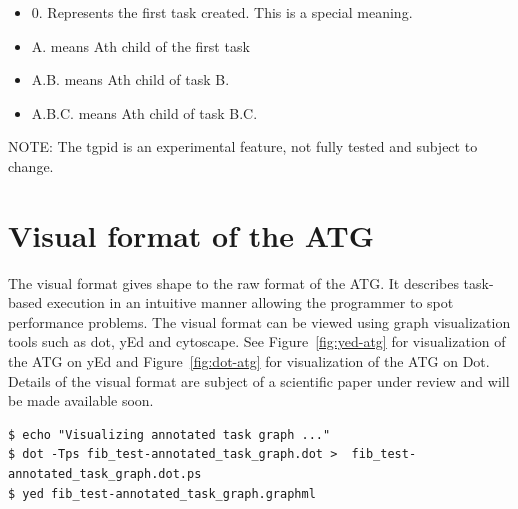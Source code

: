 \documentclass[11pt,a4paper,notitlepage]{article}
\begin{document}
\begin{itemize}
\item 0. Represents the first task created. This is a special meaning.
\item A. means Ath child of the first task
\item A.B. means Ath child of task B.
\item A.B.C. means Ath child of task B.C.
\end{itemize}

NOTE: The tgpid is an experimental feature, not fully tested and subject to change.

\section{Visual format of the ATG}
The visual format gives shape to the raw format of the ATG.
It describes task-based execution in an intuitive manner allowing the programmer to spot performance problems.
The visual format can be viewed using graph visualization tools such as dot, yEd and cytoscape.
See Figure~\ref{fig:yed-atg} for visualization of the ATG on yEd and Figure~\ref{fig:dot-atg} for visualization of the ATG on Dot.
Details of the visual format are subject of a scientific paper under review and will be made available soon.

\begin{lstlisting}[style=BashInputStyle]
$ echo "Visualizing annotated task graph ..."
$ dot -Tps fib_test-annotated_task_graph.dot >  fib_test-annotated_task_graph.dot.ps
$ yed fib_test-annotated_task_graph.graphml
\end{lstlisting}
\end{document}
